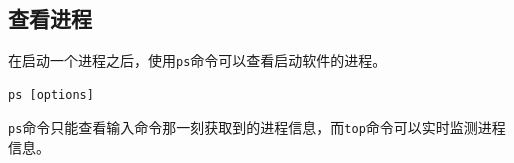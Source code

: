 \documentclass[12pt, openany, oneside]{book}
\begin{document}
\subsection{查看进程}

在启动一个进程之后，使用\lstinline|ps|命令可以查看启动软件的进程。

\vspace{-0.5cm}
\begin{lstlisting}
ps [options]
\end{lstlisting}

\begin{table}[H]
	\centering
	\caption{\lstinline|ps|参数说明}
\end{table}

\lstinline|ps|命令只能查看输入命令那一刻获取到的进程信息，而\lstinline|top|命令可以实时监测进程信息。
\end{document}
